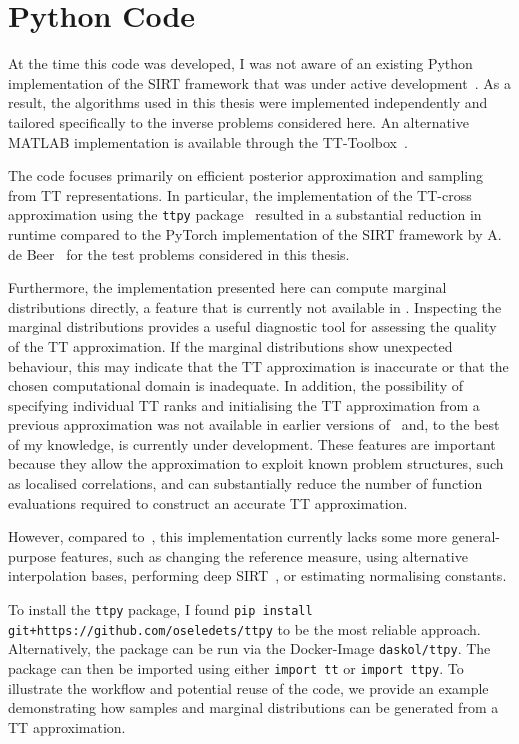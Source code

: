 \section{Python Code}
\label{sec:PythonCode}
\begin{mccorrection}
	At the time this code was developed, I was not aware of an existing Python implementation of the SIRT framework that was under active development~\cite{alexDeepPy}. As a result, the algorithms used in this thesis were implemented independently and tailored specifically to the inverse problems considered here.
	An alternative MATLAB implementation is available through the TT-Toolbox~\cite{ttToolbox}.
	
	The code focuses primarily on efficient posterior approximation and sampling from TT representations. In particular, the implementation of the TT-cross approximation using the \texttt{ttpy} package~\cite{Oseledets2018ttpy} resulted in a substantial reduction in runtime compared to the PyTorch implementation of the SIRT framework by A. de Beer~\cite{alexDeepPy} for the test problems considered in this thesis.
	
	Furthermore, the implementation presented here can compute marginal distributions directly, a feature that is currently not available in \cite{alexDeepPy}. Inspecting the marginal distributions provides a useful diagnostic tool for assessing the quality of the TT approximation. If the marginal distributions show unexpected behaviour, this may indicate that the TT approximation is inaccurate or that the chosen computational domain is inadequate.
	In addition, the possibility of specifying individual TT ranks and initialising the TT approximation from a previous approximation was not available in earlier versions of~\cite{alexDeepPy} and, to the best of my knowledge, is currently under development. These features are important because they allow the approximation to exploit known problem structures, such as localised correlations, and can substantially reduce the number of function evaluations required to construct an accurate TT approximation.
	
	However, compared to~\cite{alexDeepPy}, this implementation currently lacks some more general-purpose features, such as changing the reference measure, using alternative interpolation bases, performing deep SIRT~\cite{cui2022deep}, or estimating normalising constants.
	
	To install the \texttt{ttpy} package, I found \newline
	\texttt{pip install git+https://github.com/oseledets/ttpy}
	to be the most reliable approach. Alternatively, the package can be run via the Docker-Image
	\texttt{daskol/ttpy}. 
	The package can then be imported using either
	\texttt{import tt} or \texttt{import ttpy}.
	To illustrate the workflow and potential reuse of the code, we provide an example demonstrating how samples and marginal distributions can be generated from a TT approximation.
\end{mccorrection}

